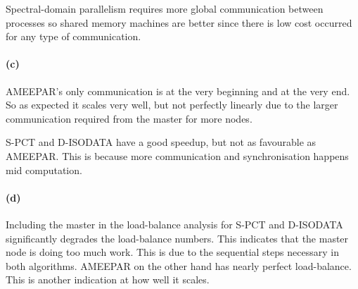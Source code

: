 \documentclass{article}
\begin{document}
Spectral-domain parallelism requires more global communication between
processes so shared memory machines are better since there is low cost
occurred for any type of communication.

\paragraph{(c)}
AMEEPAR's only communication is at the very beginning and at the very end. So
as expected it scales very well, but not perfectly linearly due to the larger
communication required from the master for more nodes.

S-PCT and D-ISODATA have a good speedup, but not as favourable as
AMEEPAR. This is because more communication and synchronisation happens mid
computation.

\paragraph{(d)}
Including the master in the load-balance analysis for S-PCT and D-ISODATA
significantly degrades the load-balance numbers. This indicates that the
master node is doing too much work. This is due to the sequential steps
necessary in both algorithms. AMEEPAR on the other hand has nearly perfect
load-balance. This is another indication at how well it scales.
\end{document}
